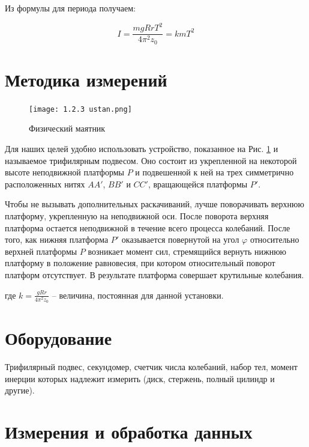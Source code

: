 \documentclass[a4, 12pt]{article}
\begin{document}
	Из формулы для периода получаем:

	\begin{equation}\label{momin}
		I = \frac{mgRrT^2}{4 \pi^2z_0} = kmT^2
	\end{equation}

	\section {Методика измерений}

	\begin{figure}
		\texttt{[image: 1.2.3 ustan.png]}
		\caption{Физический маятник}\label{risunok}
	\end{figure}

	Для наших целей удобно использовать устройство, показанное на Рис. \ref{risunok} и называемое трифилярным подвесом. Оно состоит из укрепленной на некоторой высоте неподвижной платформы $P$ и подвешенной к ней на трех симметрично расположенных нитях $AA'$, $BB'$ и $CC'$, вращающейся платформы $P'$.

	Чтобы не вызывать дополнительных раскачиваний, лучше поворачивать верхнюю платформу, укрепленную на неподвижной оси. После поворота верхняя платформа остается неподвижной в течение всего процесса колебаний. После того, как нижняя платформа $P'$ оказывается повернутой на угол $\varphi$ относительно верхней платформы $P$ возникает момент сил, стремящийся вернуть нижнюю платформу в положение равновесия, при котором относительный поворот платформ отсутствует. В результате платформа совершает крутильные колебания.

	\noindent где $k = \frac{gRr}{4\pi^2z_0}$ -- величина, постоянная для данной установки.

	\section{Оборудование}
	Трифилярный подвес, секундомер, счетчик числа колебаний, набор тел, момент инерции которых надлежит измерить (диск, стержень, полный цилиндр и другие).
\newpage
\section{Измерения и обработка данных}
\end{document}
